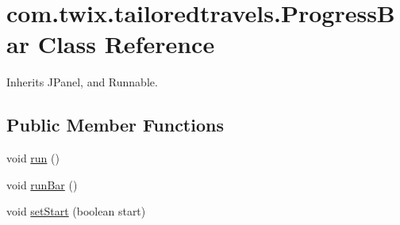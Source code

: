 \hypertarget{classcom_1_1twix_1_1tailoredtravels_1_1_progress_bar}{\section{com.\-twix.\-tailoredtravels.\-Progress\-Bar Class Reference}
\label{classcom_1_1twix_1_1tailoredtravels_1_1_progress_bar}
}


Inherits J\-Panel, and Runnable.

\subsection*{Public Member Functions}
\begin{DoxyCompactItemize}
\item 
void \hyperlink{classcom_1_1twix_1_1tailoredtravels_1_1_progress_bar_a8802d9d9a03e351ab06e2aaab77e8667}{run} ()
\item 
void \hyperlink{classcom_1_1twix_1_1tailoredtravels_1_1_progress_bar_a811166dd9c9e35124583d224f9c1b308}{run\-Bar} ()
\item 
void \hyperlink{classcom_1_1twix_1_1tailoredtravels_1_1_progress_bar_af3976bd1a762e92eba57524cf65fe400}{set\-Start} (boolean start)
\end{DoxyCompactItemize}


